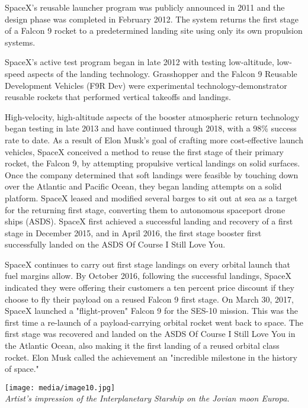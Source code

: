 SpaceX's reusable launcher program was publicly announced in 2011 and
the design phase was completed in February 2012. The system returns the
first stage of a Falcon 9 rocket to a predetermined landing site using
only its own propulsion systems.

SpaceX's active test program began in late 2012 with testing
low-altitude, low-speed aspects of the landing technology. Grasshopper
and the Falcon 9 Reusable Development Vehicles (F9R Dev) were
experimental technology-demonstrator reusable rockets that performed
vertical takeoffs and landings.

High-velocity, high-altitude aspects of the booster atmospheric return
technology began testing in late 2013 and have continued through 2018,
with a 98\% success rate to date. As a result of Elon Musk's goal of
crafting more cost-effective launch vehicles, SpaceX conceived a method
to reuse the first stage of their primary rocket, the Falcon 9, by
attempting propulsive vertical landings on solid surfaces. Once the
company determined that soft landings were feasible by touching down
over the Atlantic and Pacific Ocean, they began landing attempts on a
solid platform. SpaceX leased and modified several barges to sit out at
sea as a target for the returning first stage, converting them to
autonomous spaceport drone ships (ASDS). SpaceX first achieved a
successful landing and recovery of a first stage in December 2015, and
in April 2016, the first stage booster first successfully landed on the
ASDS Of Course I Still Love You.

SpaceX continues to carry out first stage landings on every orbital
launch that fuel margins allow. By October 2016, following the
successful landings, SpaceX indicated they were offering their customers
a ten percent price discount if they choose to fly their payload on a
reused Falcon 9 first stage. On March 30, 2017, SpaceX launched a
"flight-proven" Falcon 9 for the SES-10 mission. This was the first time
a re-launch of a payload-carrying orbital rocket went back to space. The
first stage was recovered and landed on the ASDS Of Course I Still Love
You in the Atlantic Ocean, also making it the first landing of a reused
orbital class rocket. Elon Musk called the achievement an "incredible
milestone in the history of space."

\texttt{[image: media/image10.jpg]}\\
\emph{Artist's impression of the Interplanetary Starship on the Jovian
moon Europa.}

